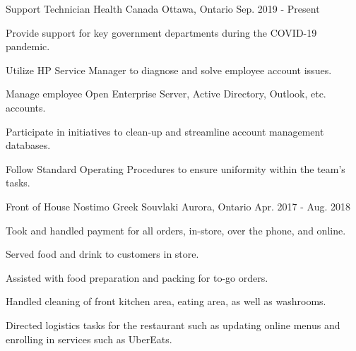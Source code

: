 

\begin{cventries}

  \cventry
    {Support Technician} %
    {Health Canada} %
    {Ottawa, Ontario} %
    {Sep. 2019 - Present} %
    {
      \begin{cvitems} %
        \item {Provide support for key government departments during the COVID-19 pandemic.}
        \item {Utilize HP Service Manager to diagnose and solve employee account issues.}
        \item {Manage employee Open Enterprise Server, Active Directory, Outlook, etc. accounts.}
	    \item {Participate in initiatives to clean-up and streamline account management databases.}
	    \item {Follow Standard Operating Procedures to ensure uniformity within the team's tasks.}
      \end{cvitems}
    }

  \cventry
    {Front of House} %
    {Nostimo Greek Souvlaki} %
    {Aurora, Ontario} %
    {Apr. 2017 - Aug. 2018} %
    {
      \begin{cvitems} %
        \item {Took and handled payment for all orders, in-store, over the phone, and online.}
        \item {Served food and drink to customers in store.}
	\item {Assisted with food preparation and packing for to-go orders.}
        \item {Handled cleaning of front kitchen area, eating area, as well as washrooms.}
	\item {Directed logistics tasks for the restaurant such as updating online menus and enrolling in services such as UberEats.}
      \end{cvitems}
    }


\end{cventries}
